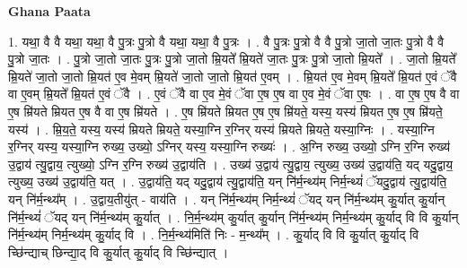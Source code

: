 \documentclass[17pt]{extarticle}
\begin{document}
\textbf{Ghana Paata } \newline

1. यथा॒ वै वै यथा॒ यथा॒ वै पु॒त्रः पु॒त्रो वै यथा॒ यथा॒ वै पु॒त्रः । . वै पु॒त्रः पु॒त्रो वै वै पु॒त्रो जा॒तो जा॒तः पु॒त्रो वै वै पु॒त्रो जा॒तः । . पु॒त्रो जा॒तो जा॒तः पु॒त्रः पु॒त्रो जा॒तो म्रि॒यते᳚ म्रि॒यते॑ जा॒तः पु॒त्रः पु॒त्रो जा॒तो म्रि॒यते᳚ । . जा॒तो म्रि॒यते᳚ म्रि॒यते॑ जा॒तो जा॒तो म्रि॒यत॑ ए॒व मे॒वम् म्रि॒यते॑ जा॒तो जा॒तो म्रि॒यत॑ ए॒वम् । . म्रि॒यत॑ ए॒व मे॒वम् म्रि॒यते᳚ म्रि॒यत॑ ए॒वं ॅवै वा ए॒वम् म्रि॒यते᳚ म्रि॒यत॑ ए॒वं ॅवै । . ए॒वं ॅवै वा ए॒व मे॒वं ॅवा ए॒ष ए॒ष वा ए॒व मे॒वं ॅवा ए॒षः । . वा ए॒ष ए॒ष वै वा ए॒ष म्रि॑यते म्रियत ए॒ष वै वा ए॒ष म्रि॑यते । . ए॒ष म्रि॑यते म्रियत ए॒ष ए॒ष म्रि॑यते॒ यस्य॒ यस्य॑ म्रियत ए॒ष ए॒ष म्रि॑यते॒ यस्य॑ । . म्रि॒य॒ते॒ यस्य॒ यस्य॑ म्रियते म्रियते॒ यस्या॒ग्नि र॒ग्निर् यस्य॑ म्रियते म्रियते॒ यस्या॒ग्निः । . यस्या॒ग्नि र॒ग्निर् यस्य॒ यस्या॒ग्नि रुख्य॒ उख्यो॒ ऽग्निर् यस्य॒ यस्या॒ग्नि रुख्यः॑ । . अ॒ग्नि रुख्य॒ उख्यो॒ ऽग्नि र॒ग्नि रुख्य॑ उ॒द्वाय॑ त्यु॒द्वाय॒ त्युख्यो॒ ऽग्नि र॒ग्नि रुख्य॑ उ॒द्वाय॑ति । . उख्य॑ उ॒द्वाय॑ त्यु॒द्वाय॒ त्युख्य॒ उख्य॑ उ॒द्वाय॑ति॒ यद् यदु॒द्वाय॒ त्युख्य॒ उख्य॑ उ॒द्वाय॑ति॒ यत् । . उ॒द्वाय॑ति॒ यद् यदु॒द्वाय॑ त्यु॒द्वाय॑ति॒ यन् नि॑र्म॒न्थ्य॑म् निर्म॒न्थ्यं॑ ॅयदु॒द्वाय॑ त्यु॒द्वाय॑ति॒ यन् नि॑र्म॒न्थ्य᳚म् । . उ॒द्वाय॒तीयु॑त् - वाय॑ति । . यन् नि॑र्म॒न्थ्य॑म् निर्म॒न्थ्यं॑ ॅयद् यन् नि॑र्म॒न्थ्य॑म् कु॒र्यात् कु॒र्यान् नि॑र्म॒न्थ्यं॑ ॅयद् यन् नि॑र्म॒न्थ्य॑म् कु॒र्यात् । . नि॒र्म॒न्थ्य॑म् कु॒र्यात् कु॒र्यान् नि॑र्म॒न्थ्य॑म् निर्म॒न्थ्य॑म् कु॒र्याद् वि वि कु॒र्यान् नि॑र्म॒न्थ्य॑म् निर्म॒न्थ्य॑म् कु॒र्याद् वि । . नि॒र्म॒न्थ्य॑मिति॑ निः - म॒न्थ्य᳚म् । . कु॒र्याद् वि वि कु॒र्यात् कु॒र्याद् वि च्छि॑न्द्याच् छिन्द्या॒द् वि कु॒र्यात् कु॒र्याद् वि च्छि॑न्द्यात् । \newline
\end{document}
